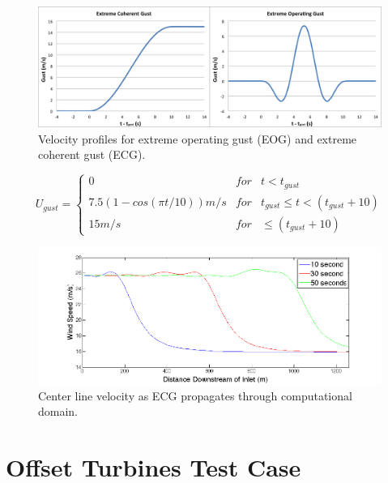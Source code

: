 \begin{figure}[ht] 
	\centering
		\includegraphics[width = \linewidth]{Figures/ch6Figures/fig6-11.png}

	\caption{Velocity profiles for extreme operating gust (EOG) and extreme coherent gust (ECG).}
	\label{fig6-11}
\end{figure}

\begin{equation} 
	U_{gust}=\left\{\begin{matrix}
0 & for  & t<t_{gust}\\ 
 7.5(1-cos(\pi t/10)) m/s & for  & t_{gust} \leq t<(t_{gust}+10)\\ 
 15 m/s &  for & \leq (t_{gust} +10)
\end{matrix}\right. 
\label{eq6-1}
\end{equation}

\begin{figure}[ht] 
	\centering
		\includegraphics[width = \linewidth]{Figures/ch6Figures/fig6-12.png}

	\caption{Center line velocity as ECG propagates through computational domain.}
	\label{fig6-12}
\end{figure}

\section{Offset Turbines Test Case} \label{section6-6}

